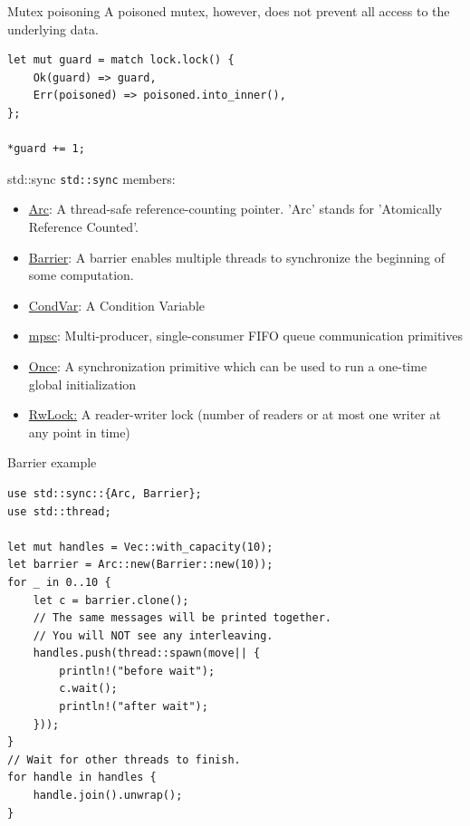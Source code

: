 \documentclass{beamer}
\begin{document}
\begin{frame}[fragile]{Mutex poisoning}
  A poisoned mutex, however, does not prevent all access to the underlying data.

  \begin{verbatim}
let mut guard = match lock.lock() {
    Ok(guard) => guard,
    Err(poisoned) => poisoned.into_inner(),
};

*guard += 1;
  \end{verbatim}
\end{frame}

\begin{frame}[fragile]{std::sync}
  \texttt{std::sync} members:

  \begin{itemize}
    \item \href{https://doc.rust-lang.org/std/sync/struct.Arc.html}{Arc}: A thread-safe reference-counting pointer. 'Arc' stands for 'Atomically Reference Counted'.
    \item \href{https://doc.rust-lang.org/std/sync/struct.Barrier.html}{Barrier}: A barrier enables multiple threads to synchronize the beginning of some computation.
    \item \href{https://doc.rust-lang.org/std/sync/struct.Condvar.html}{CondVar}: A Condition Variable
    \item \href{https://doc.rust-lang.org/std/sync/mpsc/index.html}{mpsc}: Multi-producer, single-consumer FIFO queue communication primitives
    \item \href{https://doc.rust-lang.org/std/sync/struct.Once.html}{Once}: A synchronization primitive which can be used to run a one-time global initialization
    \item \href{https://doc.rust-lang.org/std/sync/struct.RwLock.html}{RwLock:} A reader-writer lock (number of readers or at most one writer at any point in time)
  \end{itemize}
\end{frame}

\begin{frame}[fragile]{Barrier example}
  \begin{verbatim}
use std::sync::{Arc, Barrier};
use std::thread;

let mut handles = Vec::with_capacity(10);
let barrier = Arc::new(Barrier::new(10));
for _ in 0..10 {
    let c = barrier.clone();
    // The same messages will be printed together.
    // You will NOT see any interleaving.
    handles.push(thread::spawn(move|| {
        println!("before wait");
        c.wait();
        println!("after wait");
    }));
}
// Wait for other threads to finish.
for handle in handles {
    handle.join().unwrap();
}
  \end{verbatim}
\end{frame}
\end{document}
